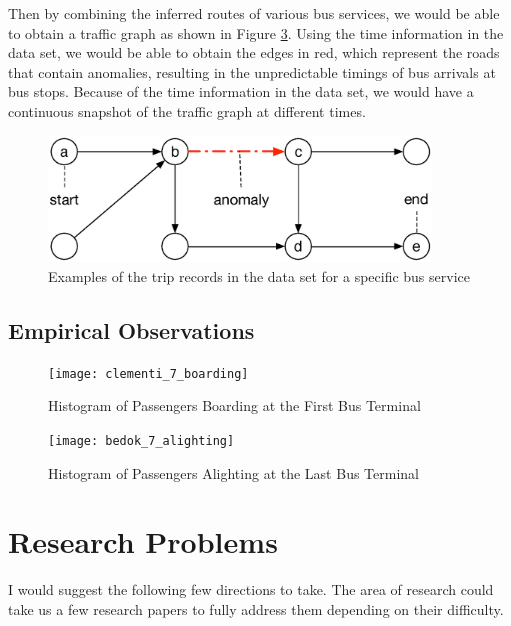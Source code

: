 \documentclass[10pt]{article}
\begin{document}
Then by combining the inferred routes of various bus services, we would be able to obtain a traffic graph as shown in Figure \ref{fig:travel_graph}. Using the time information in the data set, we would be able to obtain the edges in red, which represent the roads that contain anomalies, resulting in the unpredictable timings of bus arrivals at bus stops. Because of the time information in the data set, we would have a continuous snapshot of the traffic graph at different times.

\begin{figure}[htb]
	\centering
	\includegraphics[width=4.0in]{travel_graph}
	\caption{Examples of the trip records in the data set for a specific bus service}
	\label{fig:travel_graph}
\end{figure}

\subsection{Empirical Observations}

\begin{figure}[htb]
	\centering
	\texttt{[image: clementi\_7\_boarding]}
	\caption{Histogram of Passengers Boarding at the First Bus Terminal}
	\label{fig:travel_graph}
\end{figure}

\begin{figure}[htb]
	\centering
	\texttt{[image: bedok\_7\_alighting]}
	\caption{Histogram of Passengers Alighting at the Last Bus Terminal}
	\label{fig:travel_graph}
\end{figure}

\section{Research Problems}

I would suggest the following few directions to take. The area of research could take us a few research papers to fully address them depending on their difficulty.

\end{document}
